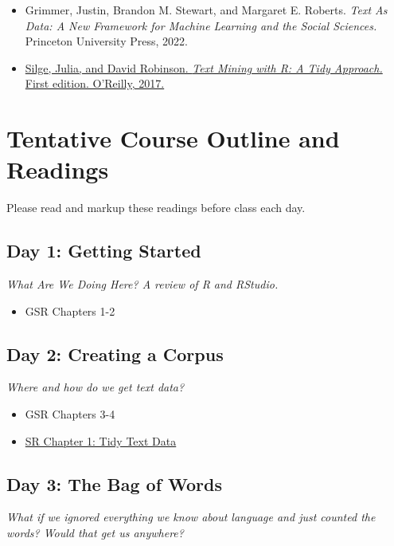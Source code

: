 \documentclass[11pt, letterpaper]{article}
\begin{document}
\begin{itemize}
\item Grimmer, Justin, Brandon M. Stewart, and Margaret E. Roberts. \textit{Text As Data: A New Framework for Machine Learning and the Social Sciences.} Princeton University Press, 2022.
\item \href{https://www.tidytextmining.com/index.html}{Silge, Julia, and David Robinson. \textit{Text Mining with R: A Tidy Approach.} First edition. O’Reilly, 2017.}
\end{itemize} 



\section*{Tentative Course Outline and Readings}

Please read and markup these readings before class each day.

\subsection*{Day 1: Getting Started}

\textit{What Are We Doing Here? A review of R and RStudio.}

\begin{itemize}
	\item GSR Chapters 1-2
\end{itemize}

\subsection*{Day 2: Creating a Corpus}

\textit{Where and how do we get text data?}

\begin{itemize}
	\item GSR Chapters 3-4
	\item \href{https://www.tidytextmining.com/tidytext.html}{SR Chapter 1: Tidy Text Data}
\end{itemize}

\subsection*{Day 3: The Bag of Words}

\textit{What if we ignored everything we know about language and just counted the words? Would that get us anywhere?}
\end{document}
